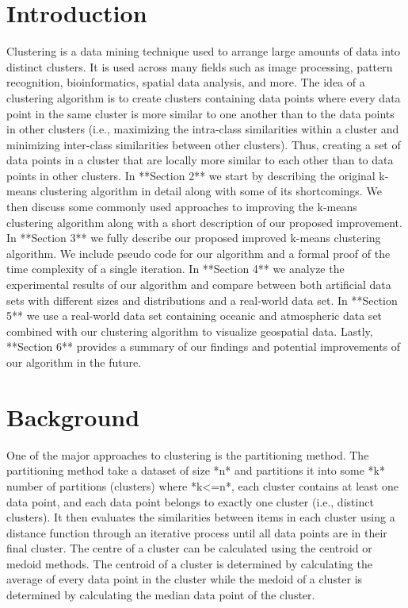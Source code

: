 \documentclass[conference]{IEEEtran}
\begin{document}
\section{Introduction}
Clustering is a data mining technique used to arrange large amounts of data into distinct clusters. It is used across many fields such as image processing, pattern recognition, bioinformatics, spatial data analysis, and more. The idea of a clustering algorithm is to create clusters containing data points where every data point in the same cluster is more similar to one another than to the data points in other clusters (i.e., maximizing the intra-class similarities within a cluster and minimizing inter-class similarities between other clusters). Thus, creating a set of data points in a cluster that are locally more similar to each other than to data points in other clusters. In **Section 2** we start by describing the original k-means clustering algorithm in detail along with some of its shortcomings. We then discuss some commonly used approaches to improving the k-means clustering algorithm along with a short description of our proposed improvement. In **Section 3** we fully describe our proposed improved k-means clustering algorithm. We include pseudo code for our algorithm and a formal proof of the time complexity of a single iteration. In **Section 4** we analyze the experimental results of our algorithm and compare between both artificial data sets with different sizes and distributions and a real-world data set. In **Section 5** we use a real-world data set containing oceanic and atmospheric data set combined with our clustering algorithm to visualize geospatial data. Lastly, **Section 6** provides a summary of our findings and potential improvements of our algorithm in the future.

\section{Background}

One of the major approaches to clustering is the partitioning method. The partitioning method take a dataset of size *n* and partitions it into some *k* number of partitions (clusters) where *k<=n*, each cluster contains at least one data point, and each data point belongs to exactly one cluster (i.e., distinct clusters). It then evaluates the similarities between items in each cluster using a distance function through an iterative process until all data points are in their final cluster. The centre of a cluster can be calculated using the centroid or medoid methods. The centroid of a cluster is determined by calculating the average of every data point in the cluster while the medoid of a cluster is determined by calculating the median data point of the cluster. \par
\end{document}
